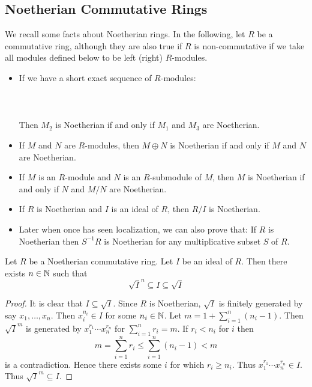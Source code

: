 \documentclass[a4paper]{article}
\begin{document}
\subsection{Noetherian Commutative Rings}
We recall some facts about Noetherian rings. In the following, let $R$ be a commutative ring, although they are also true if $R$ is non-commutative if we take all modules defined below to be left (right) $R$-modules. 

\begin{itemize}
\item If we have a short exact sequence of $R$-modules: \\~\\
\\~\\
Then $M_2$ is Noetherian if and only if $M_1$ and $M_3$ are Noetherian. 
\item If $M$ and $N$ are $R$-modules, then $M\oplus N$ is Noetherian if and only if $M$ and $N$ are Noetherian. 
\item If $M$ is an $R$-module and $N$ is an $R$-submodule of $M$, then $M$ is Noetherian if and only if $N$ and $M/N$ are Noetherian.
\item If $R$ is Noetherian and $I$ is an ideal of $R$, then $R/I$ is Noetherian. 
\item Later when once has seen localization, we can also prove that: If $R$ is Noetherian then $S^{-1}R$ is Noetherian for any multiplicative subset $S$ of $R$. 
\end{itemize}

\begin{prp}{}{} Let $R$ be a Noetherian commutative ring. Let $I$ be an ideal of $R$. Then there exists $n\in\mathbb{N}$ such that $$\sqrt{I}^n\subseteq I\subseteq\sqrt{I}$$ \tcbline
\begin{proof}
It is clear that $I\subseteq\sqrt{I}$. Since $R$ is Noetherian, $\sqrt{I}$ is finitely generated by say $x_1,\dots,x_n$. Then $x_i^{n_i}\in I$ for some $n_i\in\mathbb{N}$. Let $m=1+\sum_{i=1}^n(n_i-1)$. Then $\sqrt{I}^m$ is generated by $x_1^{r_1}\cdots x_n^{r_n}$ for $\sum_{i=1}^nr_i=m$. If $r_i<n_i$ for $i$ then $$m=\sum_{i=1}^nr_i\leq\sum_{i=1}^n(n_i-1)<m$$ is a contradiction. Hence there exists some $i$ for which $r_i\geq n_i$. Thus $x_1^{r_1}\cdots x_n^{r_n}\in I$. Thus $\sqrt{I}^m\subseteq I$. 
\end{proof}
\end{prp}
\end{document}
